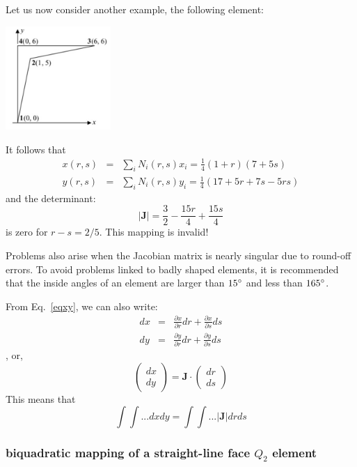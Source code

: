 Let us now consider another example, the following element:
\begin{center}
\includegraphics[width=4cm]{images/mappings/fournode/ex2}
\end{center}
It follows that
\begin{eqnarray}
x(r,s) &=& \sum_i N_i(r,s) x_i = \frac{1}{4}(1+r)(7+5s) \\ 
y(r,s) &=& \sum_i N_i(r,s) y_i = \frac{1}{4}(17+5r+7s-5rs)
\end{eqnarray}
and the determinant:
\[
|{\bm J}|=\frac{3}{2}-\frac{15r}{4}+\frac{15s}{4}
\]
is zero for $r-s=2/5$. This mapping is invalid!

\begin{remark}
Problems also arise when the Jacobian matrix is nearly singular due to round-off errors.
To avoid problems linked to badly shaped elements, it is recommended that the inside
angles of an element are larger than $15\degree$ and less than $165\degree$.
\end{remark}

From Eq.~\ref{eqxy}, we can also write:
\begin{eqnarray}
dx &=& \frac{\partial x}{\partial r} dr + \frac{\partial x}{\partial s} ds \\
dy &=& \frac{\partial y}{\partial r} dr + \frac{\partial y}{\partial s} ds 
\end{eqnarray},
or, 
\begin{equation}
\left(
\begin{array}{c}
dx \\ dy
\end{array}
\right)
={\bm J}\cdot
\left(
\begin{array}{c}
dr \\ ds
\end{array}
\right)
\end{equation}
This means that 
\[
\int \int ... dx dy = \int \int ...|{\bm J}| dr ds
\]


\subsubsection{biquadratic mapping of a straight-line face $Q_2$ element }

